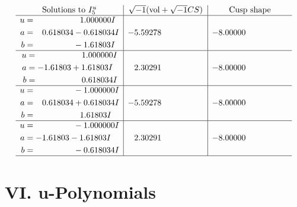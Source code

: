 \documentclass[1p]{elsarticle_modified}
\theoremstyle{definition}
\newcommand{\I}{\sqrt{-1}}
\begin{document}
$$\begin{array}{c|c|c}  
\text{Solutions to }I^u_{5}& \I (\text{vol} + \sqrt{-1}CS) & \text{Cusp shape}\\
 \hline 
\begin{aligned}
u &= \phantom{-0.000000 -}1.000000 I \\
a &= \phantom{-}0.618034 - 0.618034 I \\
b &= \phantom{-0.000000 } -1.61803 I\end{aligned}
 & -5.59278\phantom{ +0.000000I} & -8.00000\phantom{ +0.000000I} \\ \hline\begin{aligned}
u &= \phantom{-0.000000 -}1.000000 I \\
a &= -1.61803 + 1.61803 I \\
b &= \phantom{-0.000000 -}0.618034 I\end{aligned}
 & \phantom{-}2.30291\phantom{ +0.000000I} & -8.00000\phantom{ +0.000000I} \\ \hline\begin{aligned}
u &= \phantom{-0.000000 } -1.000000 I \\
a &= \phantom{-}0.618034 + 0.618034 I \\
b &= \phantom{-0.000000 -}1.61803 I\end{aligned}
 & -5.59278\phantom{ +0.000000I} & -8.00000\phantom{ +0.000000I} \\ \hline\begin{aligned}
u &= \phantom{-0.000000 } -1.000000 I \\
a &= -1.61803 - 1.61803 I \\
b &= \phantom{-0.000000 } -0.618034 I\end{aligned}
 & \phantom{-}2.30291\phantom{ +0.000000I} & -8.00000\phantom{ +0.000000I}\\
 \hline 
 \end{array}$$\newpage
\newpage\renewcommand{\arraystretch}{1}
\centering \section*{ VI. u-Polynomials}
\end{document}
